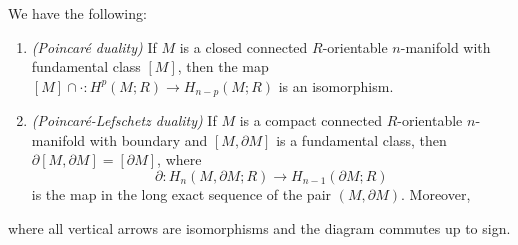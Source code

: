 \begin{theorem}\label{thm:poincare-duality}
  We have the following:
  \begin{enumerate}
    \item \emph{(Poincar\'e duality)}
      If $M$ is a closed connected
      $R$-orientable $n$-manifold with
      fundamental class $[M]$, then the
      map $[M] \cap \cdot : H^p(M; R) \to H_{n - p}(M; R)$
      is an isomorphism.
    \item \emph{(Poincar\'e-Lefschetz duality)}
      If $M$ is a compact connected
      $R$-orientable $n$-manifold with boundary
      and $[M, \partial M]$ is a fundamental class,
      then $\partial[M, \partial M] = [\partial M]$, where
      \[
        \partial : H_n(M, \partial M; R) \to H_{n - 1}(\partial M; R)
      \]
      is the map in the long exact sequence of
      the pair $(M, \partial M)$. Moreover,
      \begin{center}
        \hspace{-1em}
      \end{center}
  \end{enumerate}
  where all vertical arrows are isomorphisms
  and the diagram commutes up to sign.
\end{theorem}
